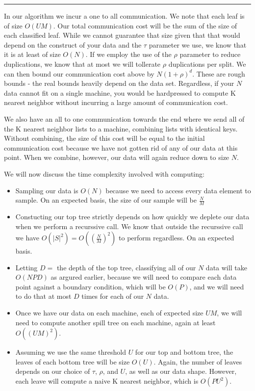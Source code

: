 \noindent\rule{12.1cm}{0.4pt}

\vspace{5 mm}
\noindent
In our algorithm we incur a one to all communication. We note that each leaf 
is of size $O(U M)$. Our total communication cost will be the sum of the size 
of each classified leaf. While we cannot guarantee that size given that that 
would depend on the construct of your data and the $\tau$ parameter we use, we 
know that it is at least of size $O(N)$. If we employ the use of the $\rho$ 
parameter to reduce duplications, we know that at most we will tollerate 
$\rho$ duplications per split. We can then bound our communication cost above 
by $N (1 + \rho)^{d}$. These are rough bounds - the real bounds heavily depend 
on the data set. Regardless, if your $N$ data cannot fit on a single machine, 
you would be hardpressed to compute K nearest neighbor without incurring a 
large amount of communication cost.

\vspace{5 mm}
\noindent
We also have an all to one communication towards the end where we send all of 
the K nearest neighbor lists to a machine, combining lists with identical keys. 
Without combining, the size of this cost will be equal to the initial 
communication cost because we have not gotten rid of any of our data at this 
point. When we combine, however, our data will again reduce down to size $N$.

\vspace{5 mm}
\noindent
We will now discuss the time complexity involved with computing:

\begin{itemize}
\item Sampling our data is $O(N)$ because we need to access every data element 
to sample. On an expected basis, the size of our sample will be $\frac{N}{M}$
\item Constucting our top tree strictly depends on how quickly we deplete our 
data when we perform a recurssive call. We know that outside the recurssive 
call we have $O(|S|^{2}) = O((\frac{N}{M})^{2})$ to perform regardless. On an 
expected basis.
\item Letting $D = $ the depth of the top tree, classifying all of our $N$ data 
will take $O(N P D)$ as argured earlier, because we will need to compare each 
data point against a boundary condition, which will be $O(P)$, and we will need 
to do that at most $D$ times for each of our $N$ data.
\item Once we have our data on each machine, each of expected size $U M$, we 
will need to compute another spill tree on each machine, again at least 
$O((U M )^{2})$.
\item Assuming we use the same threshold $U$ for our top and bottom tree, the 
leaves of each bottom tree will be size $O(U)$. Again, the number of leaves 
depends on our choice of $\tau$, $\rho$, and $U$, as well as our data shape. 
However, each leave will compute a naive K nearest neighbor, which is 
$O(P U^{2})$.
\end{itemize}

